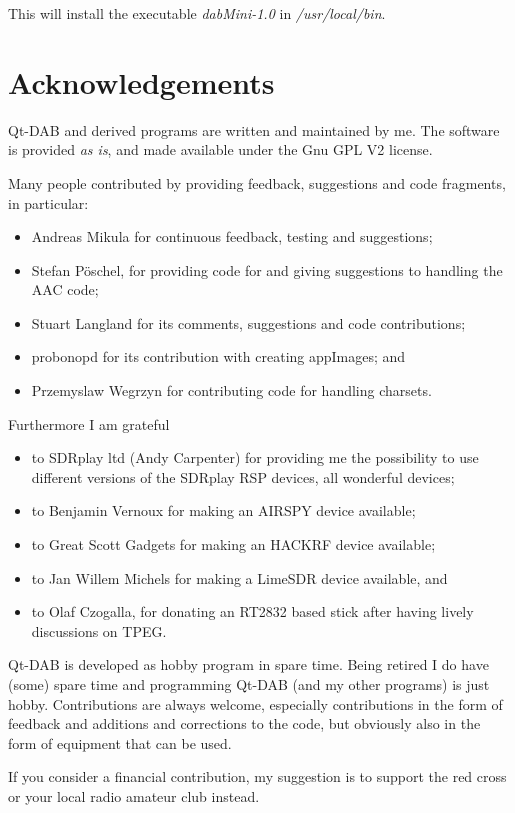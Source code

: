 \documentclass[12pt]{article}
\begin{document}
This will install the executable {\em dabMini-1.0} in {\em /usr/local/bin}.
\section{Acknowledgements}
Qt-DAB and derived programs are written and maintained by me.
The software is provided {\em as is}, and made available under the
Gnu GPL V2 license.
\par
Many people contributed
by providing feedback, suggestions and code fragments, in particular:
\begin{itemize}
\item Andreas Mikula for continuous feedback, testing and suggestions;
\item Stefan P\"oschel, for providing code for and giving suggestions to
handling the AAC code;
\item Stuart Langland for its comments, suggestions and code contributions;
\item probonopd for its contribution with creating appImages; and
\item Przemyslaw Wegrzyn for contributing code for handling
charsets.
\end{itemize}
Furthermore I am grateful 
\begin{itemize}
\item
to SDRplay ltd (Andy Carpenter) for providing me the possibility to use
different versions of the SDRplay RSP devices, all wonderful devices;
\item
to Benjamin Vernoux for making an AIRSPY device available;
\item to
Great Scott Gadgets for making an HACKRF device available;
\item
to Jan Willem Michels for making a LimeSDR device available, and
\item to Olaf Czogalla, for donating an RT2832 based stick after
having lively discussions on TPEG.
\end{itemize}
Qt-DAB is developed as hobby program in spare time.
Being retired I do have (some) spare time
and programming Qt-DAB (and my other programs) is just hobby.
Contributions are always welcome, especially contributions in the form of
feedback and additions and corrections to the code,
but obviously also in the form of equipment that can be used.
\par
If you consider a financial contribution, my suggestion is
to support the red cross or your local radio amateur club instead.
\end{document}
